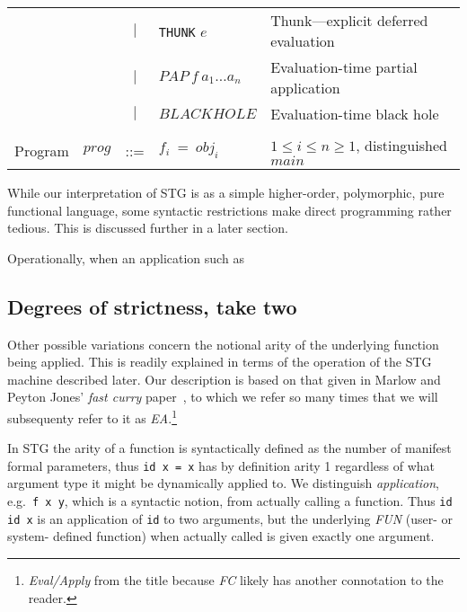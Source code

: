 \documentclass{llncs}
\begin{document}
\begin{table}
\begin{tabular}{r r c l l}
             &                & $|$ &\texttt{THUNK} $e$                            & Thunk---explicit deferred evaluation \\
             &                & $|$ & $\mathit{PAP}\ f\ a_1\dots a_n$               & Evaluation-time partial application \\
             &                & $|$ & $\mathit{BLACKHOLE}$                         & Evaluation-time black hole \\
\\
Program      & $\mathit{prog}$& ::= & $f_i\ =\ \mathit{obj}_i$                      & $1\le i \le n \ge 1$, distinguished $\mathit{main}$ \\

\end{tabular}
\end{table}

While our interpretation of STG is as a simple higher-order, polymorphic, pure
functional language, some syntactic restrictions make direct programming
rather tedious.  This is discussed further in a later section.

Operationally, when an application such as

\subsection{Degrees of strictness, take two}

Other possible variations concern the notional arity of the underlying
function being applied.  This is readily explained in terms of the operation
of the STG machine described later.  Our description is based on that given in
Marlow and Peyton Jones' \emph{fast curry} paper~\cite{fastcurry}, to which we
refer so many times that we will subsequenty refer to it as
\emph{EA}.\footnote{\emph{Eval/Apply} from the title because \emph{FC} likely
  has another connotation to the reader.}

In STG the arity of a function is syntactically defined as the number of
manifest formal parameters, thus \texttt{id x = x} has by definition arity 1
regardless of what argument type it might be dynamically applied to.  We
distinguish \emph{application}, e.g.\ \texttt{f x y}, which is a syntactic
notion, from actually calling a function. Thus \texttt{id id x} is an
application of \texttt{id} to two arguments, but the underlying \emph{FUN}
(user- or system- defined function) when actually called is given exactly one
argument.
\end{document}
